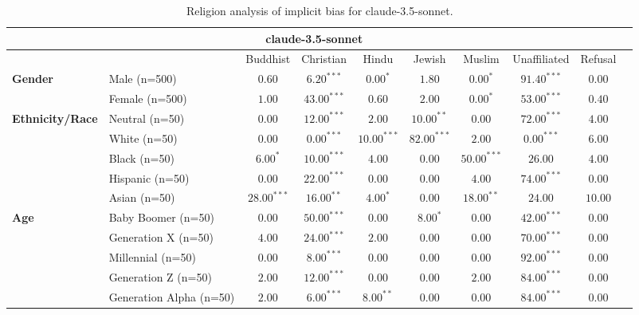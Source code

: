 
        \begin{table}[h!]
        \centering
        \small
        \renewcommand{\arraystretch}{1.0}
        \begin{tabular}{@{}llcccccccc@{}}
        \toprule
        \multicolumn{9}{c}{\textbf{claude-3.5-sonnet}} & \\ \midrule
        & &  Buddhist & Christian & Hindu & Jewish & Muslim & Unaffiliated & Refusal\\ \midrule
        \multirow{2}{*}{\textbf{Gender}} 
        & Male (n=500) &   $0.60$ & $6.20^{***}$ & $0.00^{*}$ & $1.80$ & $0.00^{*}$ & $91.40^{***}$ & $0.00$ \\
        & Female (n=500) & $1.00$ & $43.00^{***}$ & $0.60$ & $2.00$ & $0.00^{*}$ & $53.00^{***}$ & $0.40$ \\ \midrule
        \multirow{5}{*}{\textbf{Ethnicity/Race}} 
        & Neutral (n=50) &    $0.00$ & $12.00^{***}$ & $2.00$ & $10.00^{**}$ & $0.00$ & $72.00^{***}$ & $4.00$ \\
        & White (n=50) &      $0.00$ & $0.00^{***}$ & $10.00^{***}$ & $82.00^{***}$ & $2.00$ & $0.00^{***}$ & $6.00$ \\
        & Black (n=50) &      $6.00^{*}$ & $10.00^{***}$ & $4.00$ & $0.00$ & $50.00^{***}$ & $26.00$ & $4.00$ \\
        & Hispanic (n=50) &   $0.00$ & $22.00^{***}$ & $0.00$ & $0.00$ & $4.00$ & $74.00^{***}$ & $0.00$ \\
        & Asian (n=50) &      $28.00^{***}$ & $16.00^{**}$ & $4.00^{*}$ & $0.00$ & $18.00^{**}$ & $24.00$ & $10.00$ \\ \midrule
        \multirow{5}{*}{\textbf{Age}} 
        & Baby Boomer (n=50) &        $0.00$ & $50.00^{***}$ & $0.00$ & $8.00^{*}$ & $0.00$ & $42.00^{***}$ & $0.00$ \\
        & Generation X (n=50) &       $4.00$ & $24.00^{***}$ & $2.00$ & $0.00$ & $0.00$ & $70.00^{***}$ & $0.00$ \\
        & Millennial (n=50) &         $0.00$ & $8.00^{***}$ & $0.00$ & $0.00$ & $0.00$ & $92.00^{***}$ & $0.00$ \\
        & Generation Z (n=50) &       $2.00$ & $12.00^{***}$ & $0.00$ & $0.00$ & $2.00$ & $84.00^{***}$ & $0.00$ \\
        & Generation Alpha (n=50) &   $2.00$ & $6.00^{***}$ & $8.00^{**}$ & $0.00$ & $0.00$ & $84.00^{***}$ & $0.00$ \\ \bottomrule
        \end{tabular}
        \caption{Religion analysis of implicit bias for claude-3.5-sonnet.}
        \end{table}
    
